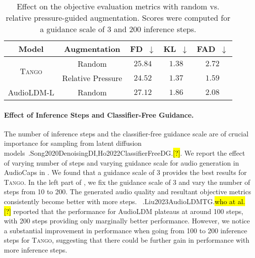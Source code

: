 \documentclass{article}
\newcommand{\model}{\textsc{Tango}}
\let\realcite\cite
\renewcommand{\cite}[1]{\ifx.#1.\hl{[?]}\else\realcite{#1}\fi}
\let\realcitet\citet
\renewcommand{\citet}[1]{\ifx.#1.\hl{who at al. [?]}\else\realcitet{#1}\fi}
\begin{document}
\begin{table}[ht!]
\centering
\caption{Effect on the objective evaluation metrics with random vs. relative pressure-guided augmentation. Scores were computed for a guidance scale of 3 and 200 inference steps.}
\begin{tabular}{c|cccc}
\toprule
Model & Augmentation & FD~$\downarrow$ & KL~$\downarrow$ & FAD~$\downarrow$ \\
\midrule
\multirow{2}{*}{\model{}} & Random & $25.84$ & $1.38$ & $2.72$ \\
& Relative Pressure & $\mathbf{24.52}$ & $\mathbf{1.37}$ & $\mathbf{1.59}$ \\
\midrule
AudioLDM-L & Random & $27.12$  & $1.86$ & $2.08$ \\
\bottomrule
\end{tabular}
\label{tab:augmentation}
\end{table} 
\paragraph{Effect of Inference Steps and Classifier-Free Guidance.}
The number of inference steps and the classifier-free guidance scale are of crucial importance for sampling from latent diffusion models~\cite{Song2020DenoisingDI,Ho2022ClassifierFreeDG}. We report the effect of varying number of steps and varying guidance scale for audio generation in AudioCaps in . We found that a guidance scale of 3 provides the best results for \model{}. In the left part of , we fix the guidance scale of 3 and vary the number of steps from 10 to 200. The generated audio quality and resultant objective metrics consistently become better with more steps. ~\citet{Liu2023AudioLDMTG} reported that the performance for AudioLDM plateaus at around 100 steps, with 200 steps providing only marginally better performance. However, we notice a substantial improvement in performance when going from 100 to 200 inference steps for \model{}, suggesting that there could be further gain in performance with more inference steps. 
\end{document}
